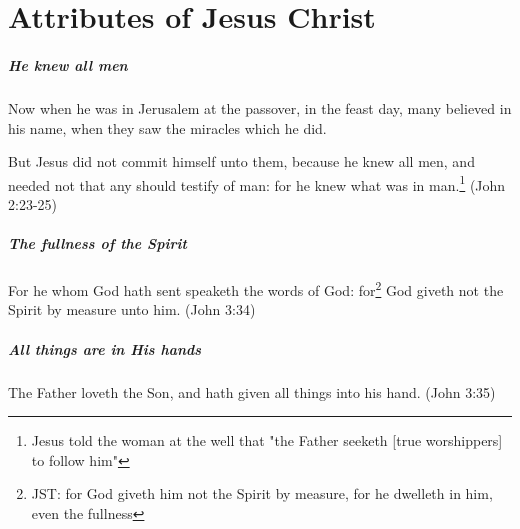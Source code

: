 \chapter{Attributes of Jesus Christ}

\paragraph{He knew all men}
Now when he was in Jerusalem at the passover, in the feast day, many believed in his name, when they saw the miracles which he did.

But Jesus did not commit himself unto them, because he knew all men, and needed not that any should testify of man: for he knew what was in man.\footnote{Jesus told the woman at the well that "the Father seeketh [true worshippers] to follow him"} (John 2:23-25)


\paragraph{The fullness of the Spirit}
For he whom God hath sent speaketh the words of God: for\footnote{JST: for God giveth him not the Spirit by measure, for he dwelleth in him, even the fullness} God giveth not the Spirit by measure unto him. (John 3:34)

\paragraph{All things are in His hands}
The Father loveth the Son, and hath given all things into his hand. (John 3:35)
